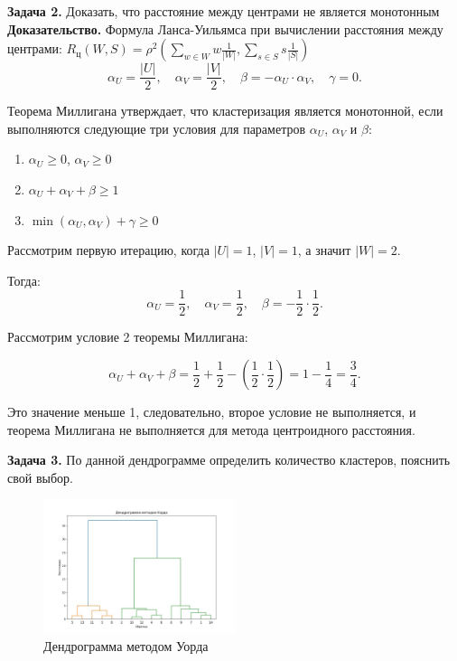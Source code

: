 \textbf{Задача 2.} Доказать, что расстояние между центрами не является монотонным
\textbf{Доказательство.}
Формула Ланса-Уильямса при вычислении расстояния между центрами: 
$R_{\text{ц}}(W, S) = \rho^2 \left( \sum_{w \in W} w \frac{1}{|W|} , \sum_{s \in S} s \frac{1}{|S|} \right)$
\[
    \alpha_U = \frac{|U|}{2}, \quad \alpha_V = \frac{|V|}{2}, \quad \beta = -\alpha_U \cdot \alpha_V, \quad \gamma = 0.
\]

Теорема Миллигана утверждает, что кластеризация является монотонной, если выполняются следующие три условия для параметров \( \alpha_U \), \( \alpha_V \) и \( \beta \):

\begin{enumerate}
    \item \( \alpha_U \geq 0 \), \( \alpha_V \geq 0 \)
    \item \( \alpha_U + \alpha_V + \beta \geq 1 \)
    \item \( \min(\alpha_U, \alpha_V) + \gamma \geq 0 \)
\end{enumerate}

Рассмотрим первую итерацию, когда $|U|=1$, $|V|=1$, а значит $|W|=2$.

Тогда:
\[
    \alpha_U = \frac{1}{2}, \quad \alpha_V = \frac{1}{2}, \quad \beta = -\frac{1}{2} \cdot \frac{1}{2}.
\]

Рассмотрим условие 2 теоремы Миллигана:

\[
    \alpha_U + \alpha_V + \beta = \frac{1}{2} + \frac{1}{2} - \left( \frac{1}{2} \cdot \frac{1}{2} \right)=1 - \frac{1}{4} = \frac{3}{4}.
\]

Это значение меньше 1, следовательно, второе условие не выполняется, и теорема Миллигана не выполняется для метода центроидного расстояния.

\textbf{Задача 3.}
По данной дендрограмме определить количество кластеров, пояснить свой выбор.

\begin{figure}[h!]
    \centering
    \includegraphics[width=0.5\textwidth]{chapters/clustering/images/figure2.jpg} %
    \caption{Дендрограмма методом Уорда}
\end{figure}

